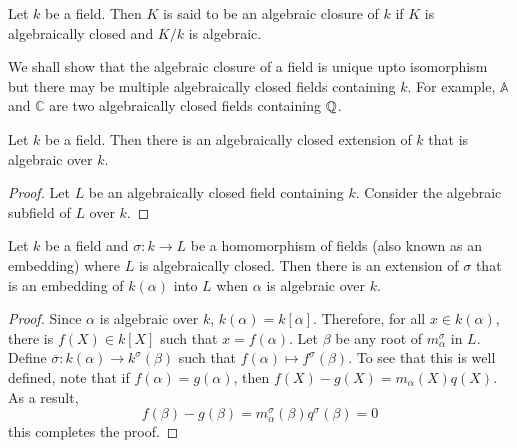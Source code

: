 \begin{definition}
    Let $k$ be a field. Then $K$ is said to be an algebraic closure of $k$ if $K$ is algebraically closed and $K/k$ is algebraic.
\end{definition}

We shall show that the algebraic closure of a field is unique upto isomorphism but there may be multiple algebraically closed fields containing $k$. For example, $\mathbb{A}$ and $\mathbb{C}$ are two algebraically closed fields containing $\mathbb{Q}$.

\begin{corollary}
    Let $k$ be a field. Then there is an algebraically closed extension of $k$ that is algebraic over $k$.
\end{corollary}
\begin{proof}
    Let $L$ be an algebraically closed field containing $k$. Consider the algebraic subfield of $L$ over $k$.
\end{proof}

\begin{lemma}
    Let $k$ be a field and $\sigma:k\to L$ be a homomorphism of fields (also known as an embedding) where $L$ is algebraically closed. Then there is an extension of $\sigma$ that is an embedding of $k(\alpha)$ into $L$ when $\alpha$ is algebraic over $k$.
\end{lemma}
\begin{proof}
    Since $\alpha$ is algebraic over $k$, $k(\alpha) = k[\alpha]$. Therefore, for all $x\in k(\alpha)$, there is $f(X)\in k[X]$ such that $x = f(\alpha)$. Let $\beta$ be any root of $m_\alpha^\sigma$ in $L$. Define $\overline{\sigma}:k(\alpha)\to k^\sigma(\beta)$ such that $f(\alpha)\mapsto f^\sigma(\beta)$. To see that this is well defined, note that if $f(\alpha) = g(\alpha)$, then $f(X) - g(X) = m_\alpha(X)q(X)$. As a result, 
    \begin{equation*}
        f(\beta) - g(\beta) = m_\alpha^\sigma(\beta)q^\sigma(\beta) = 0
    \end{equation*}
    this completes the proof.
\end{proof}

